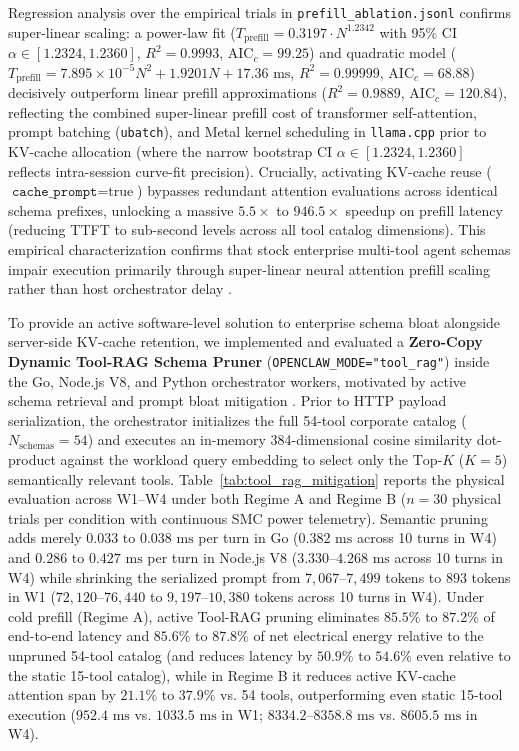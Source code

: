 \documentclass[preprint,12pt,3p]{elsarticle}
\begin{document}
Regression analysis over the empirical trials in \texttt{prefill\_ablation.jsonl} confirms super-linear scaling: a power-law fit ($T_{\text{prefill}} = 0.3197 \cdot N^{1.2342}$ with 95\% CI $\alpha \in [1.2324, 1.2360]$, $R^2 = 0.9993$, $\text{AIC}_c = 99.25$) and quadratic model ($T_{\text{prefill}} = 7.895 \times 10^{-5} N^2 + 1.9201 N + 17.36\text{ ms}$, $R^2 = 0.99999$, $\text{AIC}_c = 68.88$) decisively outperform linear prefill approximations ($R^2 = 0.9889$, $\text{AIC}_c = 120.84$), reflecting the combined super-linear prefill cost of transformer self-attention, prompt batching (\texttt{ubatch}), and Metal kernel scheduling in \texttt{llama.cpp} prior to KV-cache allocation (where the narrow bootstrap CI $\alpha \in [1.2324, 1.2360]$ reflects intra-session curve-fit precision). Crucially, activating KV-cache reuse ($\texttt{cache\_prompt} = \text{true}$) bypasses redundant attention evaluations across identical schema prefixes, unlocking a massive $5.5\times$ to $946.5\times$ speedup on prefill latency (reducing TTFT to sub-second levels across all tool catalog dimensions). This empirical characterization confirms that stock enterprise multi-tool agent schemas impair execution primarily through super-linear neural attention prefill scaling rather than host orchestrator delay \cite{kwon2023vllm}.

To provide an active software-level solution to enterprise schema bloat alongside server-side KV-cache retention, we implemented and evaluated a \textbf{Zero-Copy Dynamic Tool-RAG Schema Pruner} (\texttt{OPENCLAW\_MODE="tool\_rag"}) inside the Go, Node.js V8, and Python orchestrator workers, motivated by active schema retrieval and prompt bloat mitigation \cite{kwon2023vllm}. Prior to HTTP payload serialization, the orchestrator initializes the full 54-tool corporate catalog ($N_{\text{schemas}} = 54$) and executes an in-memory 384-dimensional cosine similarity dot-product against the workload query embedding to select only the $\text{Top-}K$ ($K=5$) semantically relevant tools. Table~\ref{tab:tool_rag_mitigation} reports the physical evaluation across W1--W4 under both Regime A and Regime B ($n=30$ physical trials per condition with continuous SMC power telemetry). Semantic pruning adds merely $0.033\text{ to }0.038\text{ ms}$ per turn in Go ($0.382\text{ ms}$ across 10 turns in W4) and $0.286\text{ to }0.427\text{ ms}$ per turn in Node.js V8 ($3.330\text{--}4.268\text{ ms}$ across 10 turns in W4) while shrinking the serialized prompt from $7{,}067\text{--}7{,}499$ tokens to $893$ tokens in W1 ($72{,}120\text{--}76{,}440$ to $9{,}197\text{--}10{,}380$ tokens across 10 turns in W4). Under cold prefill (Regime A), active Tool-RAG pruning eliminates $85.5\%\text{ to }87.2\%$ of end-to-end latency and $85.6\%\text{ to }87.8\%$ of net electrical energy relative to the unpruned 54-tool catalog (and reduces latency by $50.9\%\text{ to }54.6\%$ even relative to the static 15-tool catalog), while in Regime B it reduces active KV-cache attention span by $21.1\%\text{ to }37.9\%$ vs. 54 tools, outperforming even static 15-tool execution ($952.4\text{ ms}$ vs. $1033.5\text{ ms}$ in W1; $8334.2\text{--}8358.8\text{ ms}$ vs. $8605.5\text{ ms}$ in W4).
\end{document}
